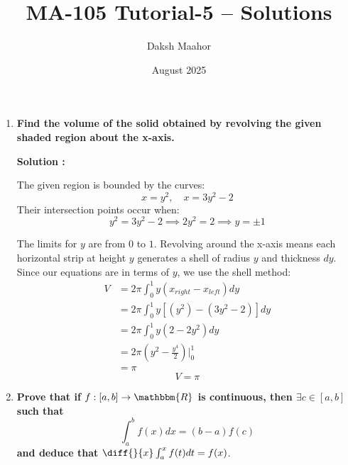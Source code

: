 \documentclass[14pt]{extarticle}
\title{MA-105 Tutorial-5 -- Solutions}
\author{Daksh Maahor}
\date{August 2025}
\begin{document}
\maketitle

\begin{enumerate}

\item \textbf{Find the volume of the solid obtained by revolving the given shaded region about the x-axis.}

\begin{center}
\end{center}

\textbf{Solution : }

The given region is bounded by the curves:
\[x = y^2, \quad x = 3y^2 - 2\]
Their intersection points occur when:
\[y^2 = 3y^2 - 2 \implies 2y^2 = 2 \implies y = \pm 1\]

The limits for $y$ are from $0$ to $1$. Revolving around the x-axis means each horizontal strip at height $y$ generates a shell of radius $y$ and thickness $dy$. Since our equations are in terms of $y$, we use the shell method:
\begin{align*}
V &= 2\pi \int_{0}^{1} y( x_{right} - x_{left} ) dy\\ &= 2\pi \int_{0}^{1} y[(y^2)-(3y^2 - 2)] dy \\&= 2\pi \int_{0}^{1} y(2 - 2y^2) dy \\&=2\pi\left(y^2-\frac{y^4}{2}\right)\Biggr|_{0}^{1} \\ &= \pi
\end{align*}
\[
\boxed{V = \pi}
\]

\newpage

\item \textbf{Prove that if $f:[a,b] \to \mathbbm{R}$ is continuous, then $\exists c \in [a,b]$ such that}
\[\int_a^b f(x)dx = (b-a)f(c)\]
\textbf{and deduce that} $\diff{}{x}\int_a^x f(t)dt = f(x)$.


\end{enumerate}
\end{document}
